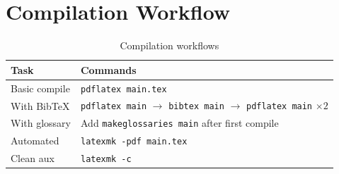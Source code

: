 \section{Compilation Workflow}

\begin{table}[H]
\centering
\begin{tabular}{ll}
\toprule
\textbf{Task} & \textbf{Commands} \\
\midrule
Basic compile  & \texttt{pdflatex main.tex} \\
With BibTeX    & \texttt{pdflatex main} $\to$ \texttt{bibtex main} $\to$ \texttt{pdflatex main} $\times 2$ \\
With glossary  & Add \texttt{makeglossaries main} after first compile \\
Automated      & \texttt{latexmk -pdf main.tex} \\
Clean aux      & \texttt{latexmk -c} \\
\bottomrule
\end{tabular}
\caption{Compilation workflows}
\end{table}
